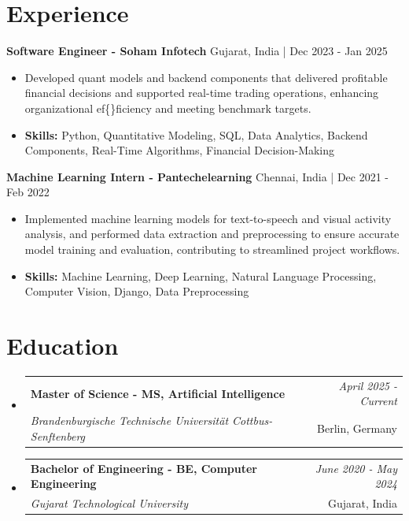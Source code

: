 \documentclass[a4paper,11pt]{article}
\makeatletter
\newcommand{\resumeSubheading}[4]{
\vspace{0.5mm}\item
    \begin{tabular*}{0.98\textwidth}[t]{l@{\extracolsep{\fill}}r}
        \textbf{#1} & \textit{\footnotesize{#4}} \\
        \textit{\footnotesize{#3}} &  \footnotesize{#2}\\
    \end{tabular*}
    \vspace{-2.4mm}
}
\makeatother
\begin{document}
\section{\textbf{Experience}}


\vspace{1mm}
  \textbf{Software Engineer - Soham Infotech} \hfill Gujarat, India | Dec 2023 - Jan 2025
\vspace{-1.5mm} %
\begin{itemize}
  \item Developed quant models and backend components that delivered profitable financial decisions and supported real-time trading operations, enhancing organizational ef\{\}ficiency and meeting benchmark targets.

\vspace{-2mm}
  \item \textbf{Skills:} Python, Quantitative Modeling, SQL, Data Analytics, Backend Components, Real-Time Algorithms, Financial Decision-Making
\end{itemize}

\vspace{1mm}
  \textbf{Machine Learning Intern - Pantechelearning} \hfill Chennai, India | Dec 2021 - Feb 2022
\vspace{-1.5mm} %
\begin{itemize}
  \item Implemented machine learning models for text-to-speech and visual activity analysis, and performed data extraction and preprocessing to ensure accurate model training and evaluation, contributing to streamlined project workflows.
\vspace{-2mm}
  \item \textbf{Skills:} Machine Learning, Deep Learning, Natural Language Processing, Computer Vision, Django, Data Preprocessing
\end{itemize}\section{\textbf{Education}}
\vspace{-0.4mm}

\begin{itemize}
\resumeSubheading
{Master of Science - MS, Artificial Intelligence }{Berlin, Germany}
{Brandenburgische Technische Universität Cottbus-Senftenberg  }{April 2025 - Current}

\vspace{1.0mm} %
\resumeSubheading
{Bachelor of Engineering - BE, Computer Engineering  }{Gujarat, India}
{Gujarat Technological University }{June 2020 - May 2024}

\end{itemize}
\end{document}
